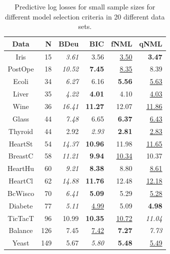 \begin{table}
\caption{Predictive log losses for small sample sizes for different model selection criteria in 20 different data sets.}
\label{tbl:preds}
\begin{center}
 \begin{tabular}{crrrrr}
    Data &     N &              BDeu &               BIC &               fNML &               qNML \\
\midrule
    Iris &    15 &     \textit{3.61} &              3.56 &   \underline{3.50} &      \textbf{3.47} \\
 PostOpe &    18 &    \textit{10.52} &     \textbf{7.45} &   \underline{8.35} &               8.39 \\
   Ecoli &    34 &     \textit{6.27} &              6.16 &      \textbf{5.56} &   \underline{5.63} \\
   Liver &    35 &     \textit{4.22} &     \textbf{4.01} &               4.10 &   \underline{4.03} \\
    Wine &    36 &    \textit{16.41} &    \textbf{11.27} &              12.07 &  \underline{11.86} \\
   Glass &    44 &     \textit{7.48} &              6.65 &      \textbf{6.37} &   \underline{6.43} \\
 Thyroid &    44 &              2.92 &     \textit{2.93} &      \textbf{2.81} &   \underline{2.83} \\
 HeartSt &    54 &    \textit{14.37} &    \textbf{10.96} &              11.98 &  \underline{11.65} \\
 BreastC &    58 &    \textit{11.21} &     \textbf{9.94} &  \underline{10.34} &              10.37 \\
 HeartHu &    60 &     \textit{9.21} &     \textbf{8.38} &               8.80 &   \underline{8.61} \\
 HeartCl &    62 &    \textit{14.88} &    \textbf{11.76} &              12.48 &  \underline{12.18} \\
 BcWisco &    70 &     \textit{6.41} &     \textbf{5.09} &               5.29 &   \underline{5.28} \\
 Diabete &    77 &     \textit{5.11} &  \underline{4.99} &               5.09 &      \textbf{4.98} \\
 TicTacT &    96 &             10.99 &    \textbf{10.35} &  \underline{10.72} &     \textit{11.04} \\
 Balance &   126 &              7.45 &  \underline{7.42} &      \textbf{7.27} &      \textit{7.73} \\
   Yeast &   149 &              5.67 &     \textit{5.80} &      \textbf{5.48} &   \underline{5.49} \\

\end{tabular}
\end{center}
\end{table}

